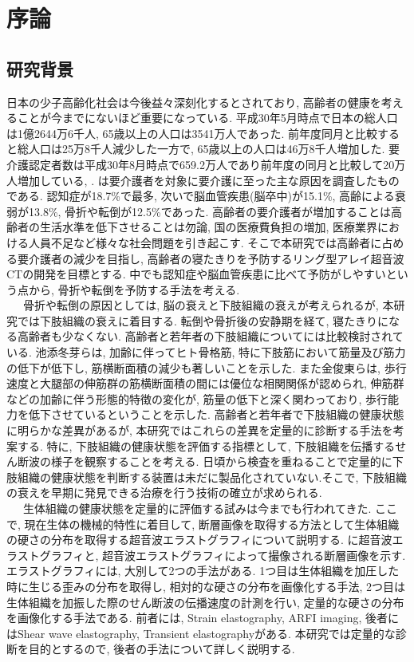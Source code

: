 \chapter{序論\label{jyoron}}
\newpage
\section{研究背景}
日本の少子高齢化社会は今後益々深刻化するとされており, 高齢者の健康を考えることが今までにないほど重要になっている. 平成30年5月時点で日本の総人口は1億2644万6千人, 65歳以上の人口は3541万人であった. 前年度同月と比較すると総人口は25万8千人減少した一方で, 65歳以上の人口は46万8千人増加した\cite{jinkou}. 要介護認定者数は平成30年8月時点で659.2万人であり前年度の同月と比較して20万人増加している\cite{youkaigo1}, \cite{youkaigo2}. は要介護者を対象に要介護に至った主な原因を調査したものである. 認知症が18.7\%で最多, 次いで脳血管疾患(脳卒中)が15.1\%, 高齢による衰弱が13.8\%, 骨折や転倒が12.5\%であった\cite{kaigogenin}. 高齢者の要介護者が増加することは高齢者の生活水準を低下させることは勿論, 国の医療費負担の増加, 医療業界における人員不足など様々な社会問題を引き起こす. そこで本研究では高齢者に占める要介護者の減少を目指し, 高齢者の寝たきりを予防するリング型アレイ超音波CTの開発を目標とする. 中でも認知症や脳血管疾患に比べて予防がしやすいという点から, 骨折や転倒を予防する手法を考える.
\\\ \ \ 骨折や転倒の原因としては, 脳の衰えと下肢組織の衰えが考えられるが, 本研究では下肢組織の衰えに着目する. 転倒や骨折後の安静期を経て, 寝たきりになる高齢者も少なくない. 高齢者と若年者の下肢組織についてには比較検討されている. 池添冬芽らは, 加齢に伴ってヒト骨格筋, 特に下肢筋において筋量及び筋力の低下が低下し, 筋横断面積の減少も著しいことを示した\cite{danmen}. また金俊東らは, 歩行速度と大腿部の伸筋群の筋横断面積の間には優位な相関関係が認められ, 伸筋群などの加齢に伴う形態的特徴の変化が, 筋量の低下と深く関わっており, 歩行能力を低下させているということを示した\cite{hokou}. 高齢者と若年者で下肢組織の健康状態に明らかな差異があるが, 本研究ではこれらの差異を定量的に診断する手法を考案する. 特に, 下肢組織の健康状態を評価する指標として, 下肢組織を伝播するせん断波の様子を観察することを考える. 日頃から検査を重ねることで定量的に下肢組織の健康状態を判断する装置は未だに製品化されていない.そこで, 下肢組織の衰えを早期に発見できる治療を行う技術の確立が求められる. 
\\\ \ \ 生体組織の健康状態を定量的に評価する試みは今までも行われてきた. ここで, 現在生体の機械的特性に着目して, 断層画像を取得する方法として生体組織の硬さの分布を取得する超音波エラストグラフィについて説明する.  に超音波エラストグラフィと, 超音波エラストグラフィによって撮像される断層画像を示す. エラストグラフィには, 大別して2つの手法がある. 1つ目は生体組織を加圧した時に生じる歪みの分布を取得し,  相対的な硬さの分布を画像化する手法, 2つ目は生体組織を加振した際のせん断波の伝播速度の計測を行い, 定量的な硬さの分布を画像化する手法である. 前者には, Strain elastography, ARFI imaging, 後者にはShear wave elastography, Transient elastographyがある. 本研究では定量的な診断を目的とするので, 後者の手法について詳しく説明する. 
